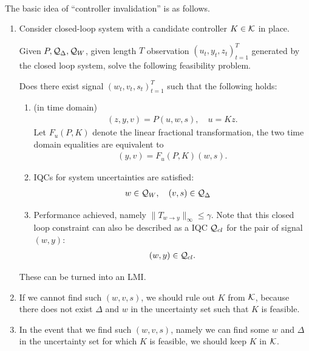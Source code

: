 \documentclass[11pt, onecolumn]{article}
\begin{document}
\paragraph{}
The basic idea of ``controller invalidation'' is as follows.


\begin{enumerate}
\item

Consider closed-loop system with a candidate controller $K\in\mathcal K$ in place.

Given $P, \mathcal Q_{\Delta}, \mathcal Q_{W}$, given length $T$ observation $(u_t, y_t, z_t)_{t=1}^{T}$
generated by the closed loop system, solve the following feasibility problem.

Does there exist signal $(w_t, v_t, s_t)_{t=1}^{T}$ such that the following holds:
\begin{enumerate}
\item {(in time domain)}
  \begin{align*} (z,y,v) = P (u,w,s), \quad u = K z.
  \end{align*}
  Let $F_u(P,K)$ denote the linear fractional transformation, the two time domain equalities are
  equivalent to
  \begin{align*} (y,v) = F_u(P,K) (w,s).
  \end{align*}

\item IQCs for system  uncertainties are satisfied:
  \begin{align*} & w\in\mathcal Q_W, \quad (v,s) \in \mathcal Q_{\Delta}
  \end{align*}

\item Performance achieved, namely $\|T_{w\to y}\|_{\infty} \le \gamma$. Note that this closed loop
  constraint can also be described as a IQC $\mathcal Q_{cl}$ for the pair of signal $(w,y)$:
  \begin{align*}
    (w,y) \in \mathcal Q_{cl}.
  \end{align*}

\end{enumerate}
These can be turned into an LMI.


\item If we cannot find such $(w,v,s)$, we should rule out $K$ from $\mathcal K$, because there does not
  exist $\Delta$ and $w$ in the uncertainty set such that $K$ is feasible.

\item In the event that we find such $(w,v,s)$, namely we can find some $w$ and  $\Delta$ in the
  uncertainty set for which $K$ is feasible, we should keep $K$ in $\mathcal K$.


\end{enumerate}
\end{document}

